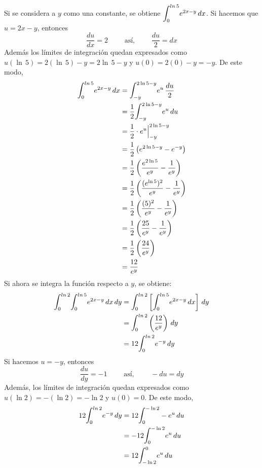 \documentclass[12pt]{exam}
\begin{document}
\begin{questions}
\begin{enumerate}[a)]
    Si se considera a $y$ como una constante, se obtiene $\mathlarger{\int}_{0}^{ln\,5}e^{2x-y}\,dx$. Si hacemos que $u=2x-y$, entonces
    $$\frac{du}{dx}=2 \qquad \text{ así, } \qquad \frac{du}{2}=dx$$
    Además los límites de integración quedan expresados como $u(\ln{\,5}) = 2(\ln{\,5})-y=2\ln{\,5}-y$ y $u(0)=2(0)-y=-y$. De este modo,
    \begin{align*}
      \mathlarger{\int}_{0}^{ln\,5}e^{2x-y}\,dx
      &= \mathlarger{\int}_{-y}^{2\ln{5}-y}e^{u}\, \frac{du}{2}  \\
      &= \frac{1}{2} \mathlarger{\int}_{-y}^{2\ln{5}-y}e^{u} \, du \\
      &= \frac{1}{2} \cdot e^u \Big| _{-y}^{2\ln{5}-y} \\
      &= \frac{1}{2} \left( e^{2\ln{5}-y}-e^{-y} \right) \\
      &= \frac{1}{2} \left( \frac{e^{2\ln{5}}}{e^y} - \frac{1}{e^y} \right) \\
      &= \frac{1}{2} \left( \frac{(e^{\ln{5}})^2}{e^y} - \frac{1}{e^y} \right) \\
      &= \frac{1}{2} \left( \frac{(5)^2}{e^y} - \frac{1}{e^y} \right) \\
      &= \frac{1}{2} \left( \frac{25}{e^y} - \frac{1}{e^y} \right) \\
      &= \frac{1}{2} \left( \frac{24}{e^y} \right) \\
      &= \frac{12}{e^y}
    \end{align*}
    Si ahora se integra la función respecto a $y$, se obtiene:
    \begin{align*}
      \mathlarger{\int}_{0}^{ln\,2}\mathlarger{\int}_{0}^{ln\,5}e^{2x-y}\,dx\,dy
      &= \mathlarger{\int}_{0}^{ln\,2}\left[\mathlarger{\int}_{0}^{ln\,5}e^{2x-y}\,dx\right]\,dy \\
      &= \mathlarger{\int}_{0}^{ln\,2}\left(\frac{12}{e^y}\right)\,dy \\
      &= 12\mathlarger{\int}_{0}^{ln\,2}e^{-y}\,dy
    \end{align*}
    Si hacemos $u=-y$, entonces  
    $$ \frac{du}{dy}=-1 \qquad \text{ así, } \qquad -du=dy $$
    Además, los límites de integración quedan expresados como $u(\ln{2})=-(\ln{2})=-\ln{2}$ y $u(0)=0$. De este modo,
    \begin{align*}
      12\mathlarger{\int}_{0}^{ln\,2}e^{-y}\,dy
      &= 12\mathlarger{\int}_{0}^{-\ln{2}}-e^{u}\,du \\
      &= -12\mathlarger{\int}_{0}^{-\ln{2}}e^{u}\,du \\
      &= 12\mathlarger{\int}_{-\ln{2}}^{0}e^{u}\,du 

\end{align*}
\end{enumerate}
\end{questions}
\end{document}
